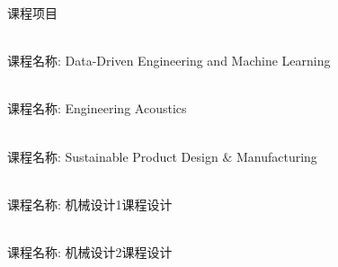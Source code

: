 \documentclass{resume} %
\begin{document}
\begin{rSection}{\fangsong 课程项目}
	
	\begin{rSubsection}{}{}
		{}{}
		\item {\\ 课程名称: Data-Driven Engineering and Machine Learning}\\
		
		\item {\\ 课程名称: Engineering Acoustics}\\
		
		\item {\\ 课程名称: Sustainable Product Design $\&$ Manufacturing}\\
		
		\item { \\ 课程名称: 机械设计1课程设计}\\
		
		\item {\\ 课程名称: 机械设计2课程设计}\\
	\end{rSubsection}
	
	
\end{rSection}

\end{document}
